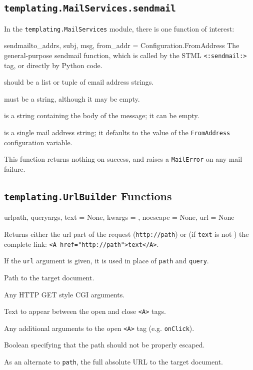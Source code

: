 \documentclass{manual}
\begin{document}
\subsection{\texttt{templating.MailServices.sendmail}}

In the \texttt{templating.MailServices} module, there is one function
of interest:

\begin{funcdesc}{sendmail}{to_addrs, subj, msg, from_addr =
Configuration.FromAddress} 
The general-purpose sendmail function, which is called
    by the STML \texttt{<:sendmail:>} tag, or directly by Python code.

\begin{argdesc}
\item[to\_addrs] should be a list or tuple of email address
    strings. 
\item[subj] must be a string, although it may be empty.
\item[msg] is a string containing the body of the message; it can
    be empty. 
\item[from\_addr] is a single mail address string; it 
    defaults to the value of the \texttt{FromAddress} configuration variable.
\end{argdesc}
This function returns nothing on success, and raises a
\texttt{MailError} on any mail failure. 

\end{funcdesc}



\subsection{\texttt{templating.UrlBuilder} Functions}

\begin{funcdesc}{url}{path, queryargs, text = None, kwargs = {},
noescape = None, url = None}

Returns either the url part of the request (\texttt{http://path}) or
(if \texttt{text} is not \None) the complete link:
\verb!<A href="http://path">text</A>!. 

If the \texttt{url} argument is given, it is used in place of
\texttt{path} and \texttt{query}.

\begin{argdesc}
\item[path] Path to the target document.
\item[queryargs] Any HTTP GET style CGI arguments.
\item[text] Text to appear between the open and close \texttt{<A>} tags.
\item[kwargs] Any additional arguments to the open \texttt{<A>} tag
(e.g. \texttt{onClick}).
\item[noescape] Boolean specifying that the path should not be
properly escaped.
\item[url] As an alternate to \texttt{path}, the full absolute URL to the
target document.
\end{argdesc}
\end{funcdesc}
\end{document}
